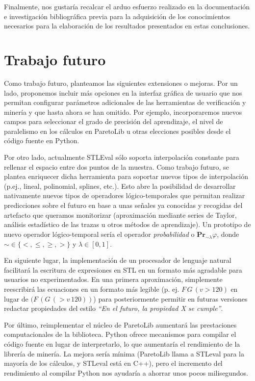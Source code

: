 Finalmente, nos gustaría recalcar el arduo esfuerzo realizado en la documentación e investigación bibliográfica previa para la adquisición de los conocimientos necesarios para la elaboración de los resultados presentados en estas conclusiones.

\section{Trabajo futuro}
Como trabajo futuro, planteamos las siguientes extensiones o mejoras. Por un lado, proponemos incluir más opciones en la interfaz gráfica de usuario que nos permitan configurar parámetros adicionales de las herramientas de verificación y minería y que hasta ahora se han omitido. Por ejemplo, incorporaremos nuevos campos para seleccionar el grado de precisión del aprendizaje, el nivel de paralelismo en los cálculos en ParetoLib u otras elecciones posibles desde el código fuente en Python.


Por otro lado, actualmente STLEval sólo soporta interpolación constante para rellenar el espacio entre dos puntos de la muestra. Como trabajo futuro, se plantea enriquecer dicha herramienta para soportar nuevos tipos de interpolación (p.ej., lineal, polinomial, splines, etc.). Esto abre la posibilidad de desarrollar nativamente nuevos tipos de operadores lógico-temporales que permitan realizar predicciones sobre el futuro en base a unas señales ya conocidas y recogidas del artefacto que queramos monitorizar (aproximación mediante series de Taylor, análisis estadístico de las trazas u otros métodos de aprendizaje). Un prototipo de nuevo operador lógico-temporal sería el operador \textit{probabilidad} o $\mathbf{Pr}_{\sim \lambda}\varphi$, donde $\sim \in \{<, \leq, \geq, >\}$ y $\lambda \in [0, 1]$.

En siguiente lugar, la implementación de un procesador de lenguaje natural facilitará la escritura de expresiones en STL en un formato más agradable para usuarios no experimentados. En una primera aproximación, simplemente reescribirá las ecuaciones en un formato más legible (p. ej. $F\, G\, (v > 120)$ en lugar de $(F \, (G \, ( > v \, 120))$) para posteriormente permitir en futuras versiones redactar propiedades del estilo \textit{``En el futuro, la propiedad X se cumple''}.

Por último, reimplementar el núcleo de ParetoLib aumentará las prestaciones computacionales de la biblioteca. Python ofrece mecanismos para compilar el código fuente en lugar de interpretarlo, lo que aumentaría el rendimiento de la librería de minería. La mejora sería mínima (ParetoLib llama a STLeval para la mayoría de los cálculos, y STLeval está en C++), pero el incremento del rendimiento al compilar Python nos ayudaría a ahorrar unos pocos milisegundos.